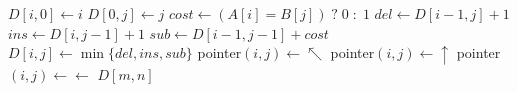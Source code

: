 \begin{algorithmic}
    \State $D[i,0] \gets i$
  \EndFor
    \State $D[0,j] \gets j$
  \EndFor
      \State $cost \gets (A[i] = B[j]) \;?\; 0 \;:\; 1$
      \State $del \gets D[i-1,j] + 1$
      \State $ins \gets D[i,j-1] + 1$
      \State $sub \gets D[i-1,j-1] + cost$
      \State $D[i,j] \gets \min\{del, ins, sub\}$
        \State pointer$(i,j) \gets \nwarrow$
        \State pointer$(i,j) \gets \uparrow$
      \Else
        \State pointer$(i,j) \gets \leftarrow$
      \EndIf
    \EndFor
  \EndFor
  \Return $D[m,n]$
\EndFunction
\end{algorithmic}